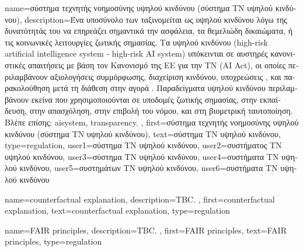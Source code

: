 {name={\foreignlanguage{greek}{σύστημα τεχνητής νοημοσύνης υψηλού κινδύνου (σύστημα ΤΝ υψηλού κινδύνου)}},
	description={\foreignlanguage{greek}{Ένα υποσύνολο 
		των} 
		 \foreignlanguage{greek}{ταξινομείται ως υψηλού κινδύνου λόγω 
		της δυνατότητάς του να επηρεάζει σημαντικά την ασφάλεια, τα θεμελιώδη 
		δικαιώματα, ή τις κοινωνικές λειτουργίες ζωτικής σημασίας. Τα}  
		\foreignlanguage{greek}{υψηλού κινδύνου} (high-risk artificial intelligence system - high-risk AI system) 
		\foreignlanguage{greek}{υπόκεινται σε αυστηρές κανονιστικές απαιτήσεις με βάση τον Κανονισμό 
		της ΕΕ για την ΤΝ} (AI Act), \foreignlanguage{greek}{οι οποίες περιλαμβάνουν αξιολογήσεις
		συμμόρφωσης, διαχείριση κινδύνου, υποχρεώσεις} , 
		\foreignlanguage{greek}{και παρακολούθηση μετά τη διάθεση στην αγορά} \cite{EUAIAct2024}. 
		\foreignlanguage{greek}{Παραδείγματα}  \foreignlanguage{greek}{υψηλού κινδύνου 
		περιλαμβάνουν εκείνα που χρησιμοποιούνται σε υποδομές ζωτικής σημασίας, στην εκπαίδευση, 
		στην απασχόληση, στην επιβολή του νόμου, και στη βιομετρική ταυτοποίηση.} 
		\\
		\foreignlanguage{greek}{Βλέπε επίσης:} \gls{aisystem}, \gls{transparency}. },
 	first={\foreignlanguage{greek}{σύστημα τεχνητής νοημοσύνης υψηλού κινδύνου (σύστημα ΤΝ υψηλού κινδύνου)}},
	text={\foreignlanguage{greek}{σύστημα ΤΝ υψηλού κινδύνου}},
	type=regulation,
	user1={\foreignlanguage{greek}{σύστημα ΤΝ υψηλού κινδύνου}}, %
	user2={\foreignlanguage{greek}{συστήματος ΤΝ υψηλού κινδύνου}}, %
	user3={\foreignlanguage{greek}{σύστημα ΤΝ υψηλού κινδύνου}}, %
	user4={\foreignlanguage{greek}{συστήματα ΤΝ υψηλού κινδύνου}}, %
	user5={\foreignlanguage{greek}{συστημάτων ΤΝ υψηλού κινδύνου}}, %
	user6={\foreignlanguage{greek}{συστήματα ΤΝ υψηλού κινδύνου}} %
}

{name={counterfactual explanation},
	description={TBC. },
	first={counterfactual explanation},
	text={counterfactual explanation},
	type=regulation
}

{name={FAIR principles},
	description={TBC. },
	first={FAIR principles},
	text={FAIR principles},
	type=regulation
}

